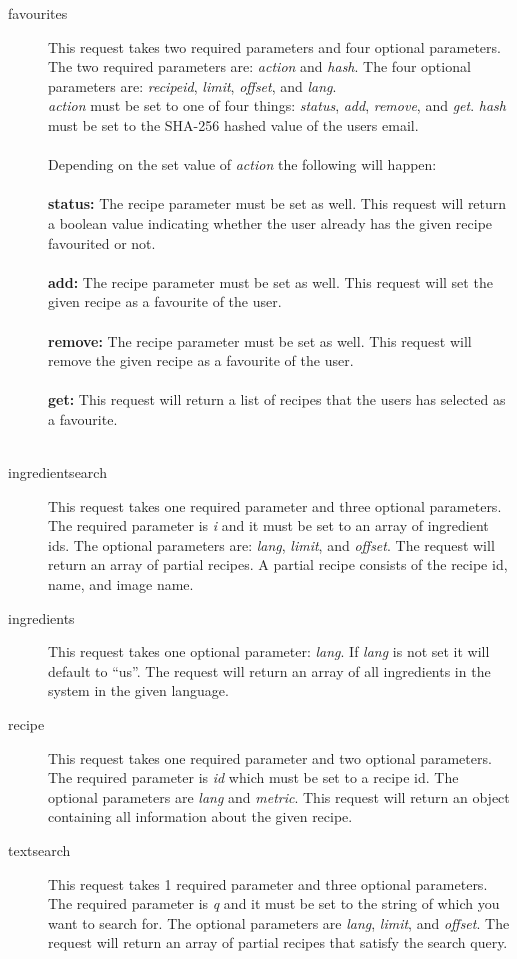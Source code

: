 \begin{description}
\item[favourites] This request takes two required parameters and four optional parameters. The two required parameters are: \textit{action} and \textit{hash}. The four optional parameters are: \textit{recipeid}, \textit{limit}, \textit{offset}, and \textit{lang}.\\
  \textit{action} must be set to one of four things: \textit{status}, \textit{add}, \textit{remove}, and \textit{get}. \textit{hash} must be set to the SHA-256 hashed value of the users email.\\\\
  Depending on the set value of \textit{action} the following will happen:\\\\
  \textbf{status:} The recipe parameter must be set as well. This request will return a boolean value indicating whether the user already has the given recipe favourited or not.\\\\
  \textbf{add:} The recipe parameter must be set as well. This request will set the given recipe as a favourite of the user.\\\\
  \textbf{remove:} The recipe parameter must be set as well. This request will remove the given recipe as a favourite of the user.\\\\
  \textbf{get:} This request will return a list of recipes that the users has selected as a favourite.\\\\
\item[ingredientsearch] This request takes one required parameter and three optional parameters. The required parameter is \textit{i} and it must be set to an array of ingredient ids. The optional parameters are: \textit{lang}, \textit{limit}, and \textit{offset}. The request will return an array of partial recipes. A partial recipe consists of the recipe id, name, and image name.
\item[ingredients] This request takes one optional parameter: \textit{lang}. If \textit{lang} is not set it will default to ``us''. The request will return an array of all ingredients in the system in the given language.
\item[recipe] This request takes one required parameter and two optional parameters. The required parameter is \textit{id} which must be set to a recipe id. The optional parameters are \textit{lang} and \textit{metric}. This request will return an object containing all information about the given recipe.
\item[textsearch] This request takes 1 required parameter and three optional parameters. The required parameter is \textit{q} and it must be set to the string of which you want to search for. The optional parameters are \textit{lang}, \textit{limit}, and \textit{offset}. The request will return an array of partial recipes that satisfy the search query.
\end{description}



